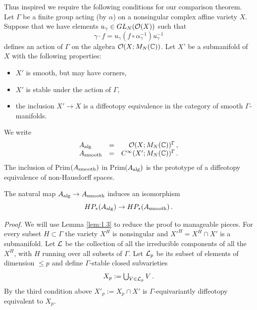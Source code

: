 Thus inspired we require the following conditions for our
comparison theorem. Let $\Gamma$ be a finite group acting (by
$\alpha$) on a nonsingular complex affine variety $X$. Suppose that
we have elements $u_\gamma \in GL_N (\mathcal O (X))$ such that
\[
\gamma \cdot f = u_\gamma (f \circ \alpha_\gamma^{-1} ) u_\gamma^{-1}
\]
defines an action of $\Gamma$ on the algebra $\mathcal O (X;M_N (\mathbb C ))$.
Let $X'$ be a submanifold of $X$ with the following properties:
\begin{itemize}
\item $X'$ is smooth, but may have corners,
\item $X'$ is stable under the action of $\Gamma$,
\item the inclusion $X' \to X$ is a diffeotopy equivalence
in the category of smooth $\Gamma$-manifolds.
\end{itemize}
We write
\[
\begin{array}{lcr}
A_\mathrm{alg} & = & \mathcal O (X;M_N (\mathbb C ))^\Gamma \,, \\
A_\mathrm{smooth} & = & C^\infty (X';M_N (\mathbb C ))^\Gamma \,.
\end{array}
\]
The inclusion of Prim$ (A_\mathrm{smooth} )$ in Prim$ (A_\mathrm{alg} )$ is the prototype
of a diffeotopy equivalence of non-Hausdorff spaces.
\begin{thm}\label{thm:1.7}
The natural map $A_\mathrm{alg} \to A_\mathrm{smooth}$ induces an isomorphism
\[
HP_* (A_\mathrm{alg} ) \to HP_* (A_\mathrm{smooth} ) \,.
\]
\end{thm}
\emph{Proof.} We will use Lemma \ref{lem:1.3} to reduce the proof to
manageable pieces. For every subset $H \subset \Gamma$ the variety
$X^H$ is nonsingular and $X'^H = X^H \cap X'$ is a submanifold. Let
$\mathcal L$ be the collection of all the irreducible components of all the $X^H$, with 
$H$ running over all subsets of $\Gamma$. Let $\mathcal L_p$ be its subset of 
elements of dimension $\leq p$ and define $\Gamma$-stable closed subvarieties
\[
X_p := {\textstyle \bigcup_{V \in \mathcal L_p}} \, V \,.
\]
By the third condition above $X'_p := X_p \cap X'$ is $\Gamma$-equivariantly 
diffeotopy equivalent to $X_p$.

